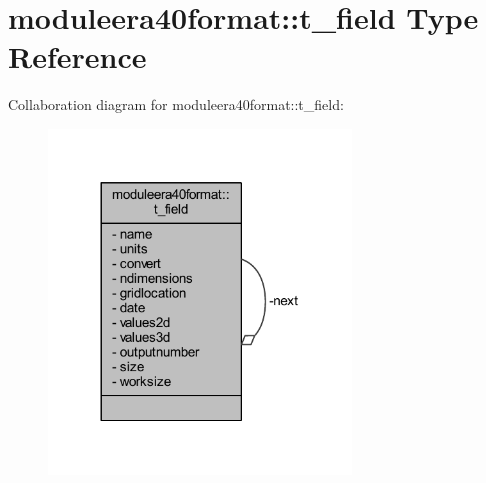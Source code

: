 \hypertarget{structmoduleera40format_1_1t__field}{}\section{moduleera40format\+:\+:t\+\_\+field Type Reference}
\label{structmoduleera40format_1_1t__field}


Collaboration diagram for moduleera40format\+:\+:t\+\_\+field\+:\nopagebreak
\begin{figure}[H]
\begin{center}
\leavevmode
\includegraphics[width=228pt]{structmoduleera40format_1_1t__field__coll__graph}
\end{center}
\end{figure}
